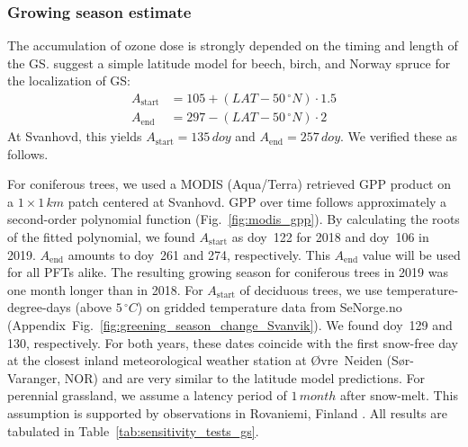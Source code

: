 \documentclass[bg, manuscript]{copernicus}
\begin{document}
\subsubsection{Growing season estimate}
\label{subsec:gs_est}

The accumulation of ozone dose is strongly depended on the timing and length of the GS. \citet{ICP:MappingManual2017} suggest a simple latitude model for beech, birch, and Norway spruce for the localization of GS:
%
\begin{align}
  A_\mathrm{start} &= 105 + (LAT-50\,\unit{^\circ N})\cdot 1.5\\
  A_\mathrm{end} &= 297 - (LAT-50\,\unit{^\circ N})\cdot 2
\end{align}
%
At Svanhovd, this yields $A_\mathrm{start}=135\,\unit{doy}$ and $A_\mathrm{end}=257\,\unit{doy}$. We verified these as follows.

For coniferous trees, we used a MODIS (Aqua/Terra) retrieved GPP product \citep{MODIS_PSN} on a $1\times 1\,\unit{km}$ patch centered at Svanhovd. GPP over time follows approximately a second-order polynomial function (Fig.~\ref{fig:modis_gpp}). By calculating the roots of the fitted polynomial, we found $A_\text{start}$ as \unit{doy}~122 for 2018 and \unit{doy}~106 in 2019. $A_\text{end}$ amounts to \unit{doy}~261 and 274, respectively. This $A_\mathrm{end}$ value will be used for all PFTs alike. The resulting growing season for coniferous trees in 2019 was one month longer than in 2018. For $A_\text{start}$ of deciduous trees, we use temperature-degree-days (above $5\,\unit{^\circ C}$) on gridded temperature data from SeNorge.no (Appendix~Fig.~\ref{fig:greening_season_change_Svanvik}). We found \unit{doy}~129 and 130, respectively. For both years, these dates coincide with the first snow-free day at the closest inland meteorological weather station at Øvre~Neiden (Sør-Varanger, NOR) and are very similar to the latitude model predictions. For perennial grassland, we assume a latency period of $1\,\unit{month}$ after snow-melt. This assumption is supported by observations in Rovaniemi, Finland \citep[][Supplement~Fig.~S1]{FCR:Korhonen2018}. All results are tabulated in Table~\ref{tab:sensitivity_tests_gs}.
\end{document}
